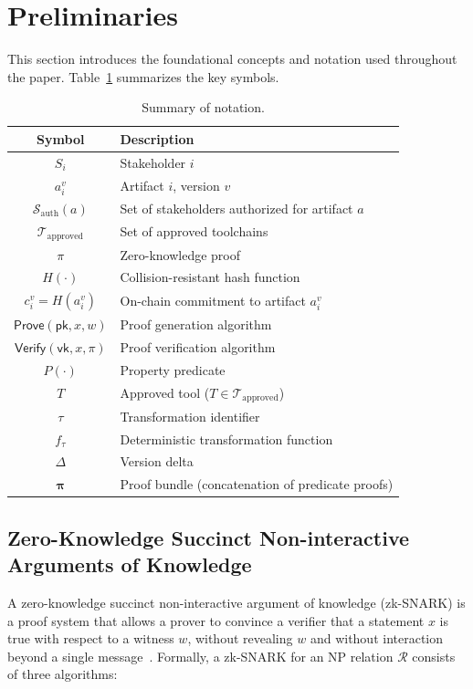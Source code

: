 \section{Preliminaries}
\label{sec:preliminaries}

This section introduces the foundational concepts and notation used throughout the paper.
Table~\ref{tab:notation} summarizes the key symbols.

\begin{table}[t]
\centering
\caption{Summary of notation.}
\label{tab:notation}
\begin{tabular}{cl}
\toprule
\textbf{Symbol} & \textbf{Description} \\
\midrule
$S_i$ & Stakeholder $i$ \\
$a_i^{v}$ & Artifact $i$, version $v$ \\
$\mathcal{S}_{\text{auth}}(a)$ & Set of stakeholders authorized for artifact $a$ \\
$\mathcal{T}_{\text{approved}}$ & Set of approved toolchains \\
$\pi$ & Zero-knowledge proof \\
$H(\cdot)$ & Collision-resistant hash function \\
$c_i^{v} = H(a_i^{v})$ & On-chain commitment to artifact $a_i^{v}$ \\
$\textsf{Prove}(\mathsf{pk}, x, w)$ & Proof generation algorithm \\
$\textsf{Verify}(\mathsf{vk}, x, \pi)$ & Proof verification algorithm \\
$P(\cdot)$ & Property predicate \\
$T$ & Approved tool ($T \in \mathcal{T}_{\text{approved}}$) \\
$\tau$ & Transformation identifier \\
$f_\tau$ & Deterministic transformation function \\
$\Delta$ & Version delta \\
$\boldsymbol{\pi}$ & Proof bundle (concatenation of predicate proofs) \\
\bottomrule
\end{tabular}
\end{table}

\subsection{Zero-Knowledge Succinct Non-interactive Arguments of Knowledge}
\label{sec:prelim-zksnark}

A zero-knowledge succinct non-interactive argument of knowledge (zk-SNARK) is a proof system that allows a prover to convince a verifier that a statement $x$ is true with respect to a witness $w$, without revealing $w$ and without interaction beyond a single message~\cite{groth2016size}.
Formally, a zk-SNARK for an NP relation $\mathcal{R}$ consists of three algorithms:


